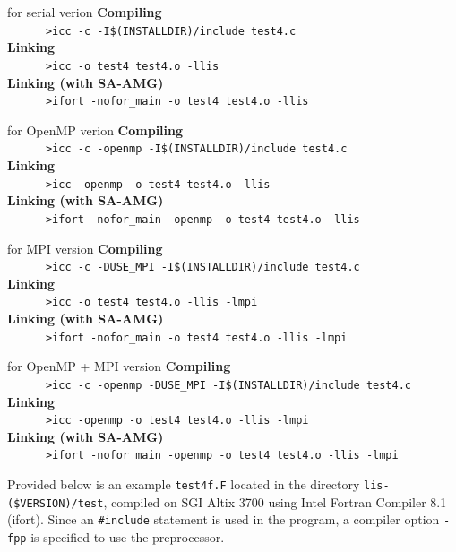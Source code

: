 \documentclass[a4paper]{article}
\begin{document}
\begin{itembox}[l]{for serial verion}
\small
{\bf Compiling}\\
\verb+      >icc -c -I$(INSTALLDIR)/include test4.c+\\
{\bf Linking}\\
\verb+      >icc -o test4 test4.o -llis+\\
{\bf Linking (with SA-AMG)}\\
\verb+      >ifort -nofor_main -o test4 test4.o -llis+
\end{itembox}
\begin{itembox}[l]{for OpenMP verion}
\small
{\bf Compiling}\\
\verb+      >icc -c -openmp -I$(INSTALLDIR)/include test4.c+\\
{\bf Linking}\\
\verb+      >icc -openmp -o test4 test4.o -llis+\\
{\bf Linking (with SA-AMG)}\\
\verb+      >ifort -nofor_main -openmp -o test4 test4.o -llis+
\end{itembox}
\begin{itembox}[l]{for MPI version}
\small
{\bf Compiling}\\
\verb+      >icc -c -DUSE_MPI -I$(INSTALLDIR)/include test4.c+\\
{\bf Linking}\\
\verb+      >icc -o test4 test4.o -llis -lmpi+\\
{\bf Linking (with SA-AMG)}\\
\verb+      >ifort -nofor_main -o test4 test4.o -llis -lmpi+
\end{itembox}
\begin{itembox}[l]{for OpenMP + MPI version}
\small
{\bf Compiling}\\
\verb+      >icc -c -openmp -DUSE_MPI -I$(INSTALLDIR)/include test4.c+\\
{\bf Linking}\\
\verb+      >icc -openmp -o test4 test4.o -llis -lmpi+\\
{\bf Linking (with SA-AMG)}\\
\verb+      >ifort -nofor_main -openmp -o test4 test4.o -llis -lmpi+
\end{itembox}

Provided below is an example \verb|test4f.F| located 
in the directory \verb|lis-($VERSION)/test|, compiled on SGI Altix 3700 
using Intel Fortran Compiler 8.1 (ifort). 
Since an \verb|#include| statement is used in the program, 
a compiler option \verb|-fpp| is specified to use the preprocessor. 
\end{document}
